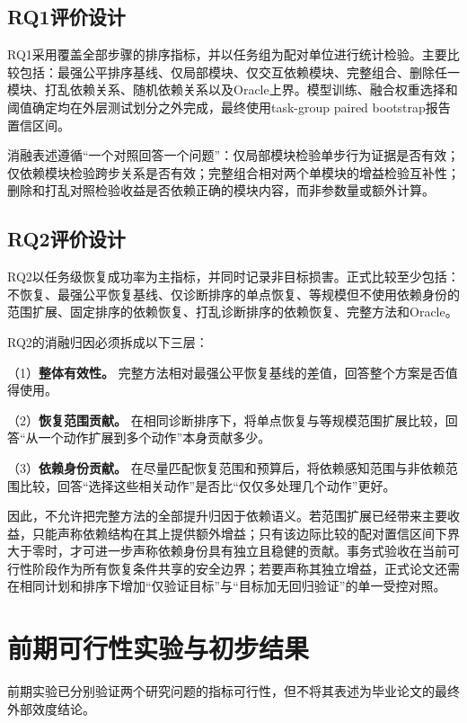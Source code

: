 \subsection{RQ1评价设计}

RQ1采用覆盖全部步骤的排序指标，并以任务组为配对单位进行统计检验。主要比较包括：最强公平排序基线、仅局部模块、仅交互依赖模块、完整组合、删除任一模块、打乱依赖关系、随机依赖关系以及Oracle上界。模型训练、融合权重选择和阈值确定均在外层测试划分之外完成，最终使用task-group paired bootstrap报告置信区间。

消融表述遵循“一个对照回答一个问题”：仅局部模块检验单步行为证据是否有效；仅依赖模块检验跨步关系是否有效；完整组合相对两个单模块的增益检验互补性；删除和打乱对照检验收益是否依赖正确的模块内容，而非参数量或额外计算。

\subsection{RQ2评价设计}

RQ2以任务级恢复成功率为主指标，并同时记录非目标损害。正式比较至少包括：不恢复、最强公平恢复基线、仅诊断排序的单点恢复、等规模但不使用依赖身份的范围扩展、固定排序的依赖恢复、打乱诊断排序的依赖恢复、完整方法和Oracle。

RQ2的消融归因必须拆成以下三层：

（1）\textbf{整体有效性。} 完整方法相对最强公平恢复基线的差值，回答整个方案是否值得使用。

（2）\textbf{恢复范围贡献。} 在相同诊断排序下，将单点恢复与等规模范围扩展比较，回答“从一个动作扩展到多个动作”本身贡献多少。

（3）\textbf{依赖身份贡献。} 在尽量匹配恢复范围和预算后，将依赖感知范围与非依赖范围比较，回答“选择这些相关动作”是否比“仅仅多处理几个动作”更好。

因此，不允许把完整方法的全部提升归因于依赖语义。若范围扩展已经带来主要收益，只能声称依赖结构在其上提供额外增益；只有该边际比较的配对置信区间下界大于零时，才可进一步声称依赖身份具有独立且稳健的贡献。事务式验收在当前可行性阶段作为所有恢复条件共享的安全边界；若要声称其独立增益，正式论文还需在相同计划和排序下增加“仅验证目标”与“目标加无回归验证”的单一受控对照。

\section{前期可行性实验与初步结果}

前期实验已分别验证两个研究问题的指标可行性，但不将其表述为毕业论文的最终外部效度结论。

